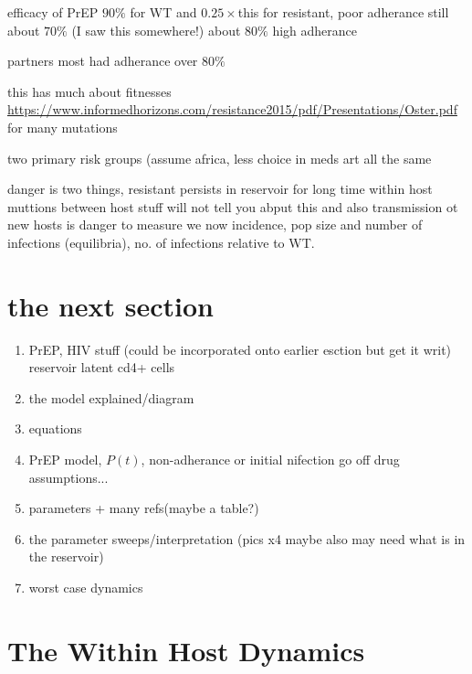 \documentclass[DIV=15]{scrartcl}
\begin{document}
efficacy of PrEP $90\%$ for WT and $0.25\times$this for resistant, poor adherance still  about $70\%$ (I saw this somewhere!) about $80\%$ high adherance

partners most had adherance over $80\%$

this has much about fitnesses \url{https://www.informedhorizons.com/resistance2015/pdf/Presentations/Oster.pdf} for many mutations 



two primary risk groups (assume africa, less choice in meds art all the same


danger is two things, resistant persists in reservoir for long time within host muttions between host stuff will not tell you abput this and also transmission ot new hosts is danger to measure we now incidence, pop size and number of infections (equilibria), no. of infections relative to WT.






\section{the next section}
\begin{enumerate}
\item PrEP, HIV stuff (could be incorporated onto earlier esction but get it writ) reservoir latent cd4+ cells
\item the model explained/diagram
\item equations 
\item PrEP model, $P(t)$, non-adherance or initial nifection go off drug assumptions...
\item parameters + many refs(maybe a table?)
\item the parameter sweeps/interpretation (pics x4 maybe also may need what is in the reservoir)
\item worst case dynamics


\end{enumerate}
\fi


\iffalse
\section{The Within Host Dynamics}
\label{The Within Host Dynamics}



\end{document}

